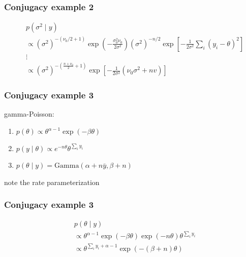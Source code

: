 \documentclass{beamer}
\begin{document}

\begin{frame}[fragile]
\frametitle{Conjugacy example 2}

\begin{align*}
&p(\sigma^2 \mid y)\\
&\propto (\sigma^2)^{-(\nu_0/2+1)} \exp\left( - \frac{\sigma_0^2 \nu_0}{ 2\sigma^2} \right)(\sigma^2)^{-n/2} \exp\left[-\frac{1}{2 \sigma^2} \sum_i \left(y_i - \theta \right)^2 \right] \\
& \vdots \tag{homework} \\
&\propto (\sigma^2)^{-(\frac{n + \nu_0}{2}  +1)} \exp\left[-\frac{1}{2 \sigma^2}\left(\nu_0 \sigma^2 + n v  \right)  \right]
\end{align*}

\end{frame}


\begin{frame}[fragile]
\frametitle{Conjugacy example 3}


gamma-Poisson:
\begin{enumerate}
\item $p(\theta) \propto \theta^{\alpha - 1}\exp\left( - \beta \theta \right)$
\item $p(y \mid \theta) \propto e^{-n\theta} \theta^{\sum_i y_i}$
\item $p(\theta \mid y)  = \text{Gamma}(\alpha + n\bar{y}, \beta + n)$
\end{enumerate}

note the rate parameterization
\end{frame}


\begin{frame}[fragile]
\frametitle{Conjugacy example 3}


\begin{align*}
&p(\theta \mid y)\\
&\propto \theta^{\alpha - 1}\exp\left( - \beta \theta \right) \exp(-n\theta) \theta^{\sum_i y_i} \\
&\propto \theta^{\sum_i y_i + \alpha - 1}\exp\left( - (\beta +n)\theta \right)
\end{align*}

\end{frame}
\end{document}
